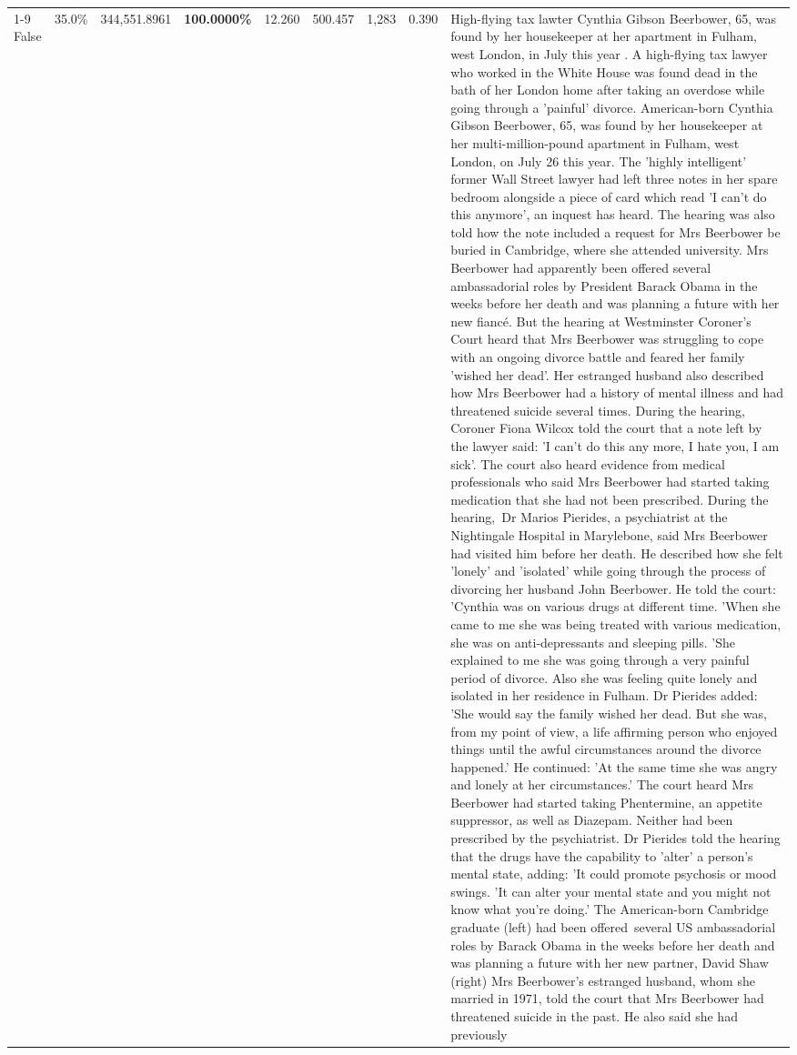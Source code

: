\begin{table}[H]
\begin{tabular}{lllrlllll}
\cline{1-9}
False & 35.0\% & 344,551.8961 & \bfseries \color{red} 100.0000\% & 12.260 & 500.457 & 1,283 & 0.390 & High-flying tax lawter Cynthia Gibson Beerbower, 65, was found by her housekeeper at her apartment in Fulham, west London, in July this year . A high-flying tax lawyer who worked in the White House was found dead in the bath of her London home after taking an overdose while going through a 'painful' divorce. American-born Cynthia Gibson Beerbower, 65, was found by her housekeeper at her multi-million-pound apartment in Fulham, west London, on July 26 this year. The 'highly intelligent' former Wall Street lawyer had left three notes in her spare bedroom alongside a piece of card which read 'I can't do this anymore', an inquest has heard. The hearing was also told how the note included a request for Mrs Beerbower be buried in Cambridge, where she attended university. Mrs Beerbower had apparently been offered several ambassadorial roles by President Barack Obama in the weeks before her death and was planning a future with her new fiancé. But the hearing at Westminster Coroner's Court heard that Mrs Beerbower was struggling to cope with an ongoing divorce battle and feared her family 'wished her dead'. Her estranged husband also described how Mrs Beerbower had a history of mental illness and had threatened suicide several times. During the hearing, Coroner Fiona Wilcox told the court that a note left by the lawyer said: 'I can't do this any more, I hate you, I am sick'. The court also heard evidence from medical professionals who said Mrs Beerbower had started taking medication that she had not been prescribed. During the hearing, Dr Marios Pierides, a psychiatrist at the Nightingale Hospital in Marylebone, said Mrs Beerbower had visited him before her death. He described how she felt 'lonely' and 'isolated' while going through the process of divorcing her husband John Beerbower. He told the court: 'Cynthia was on various drugs at different time. 'When she came to me she was being treated with various medication, she was on anti-depressants and sleeping pills. 'She explained to me she was going through a very painful period of divorce. Also she was feeling quite lonely and isolated in her residence in Fulham. Dr Pierides added: 'She would say the family wished her dead. But she was, from my point of view, a life affirming person who enjoyed things until the awful circumstances around the divorce happened.' He continued: 'At the same time she was angry and lonely at her circumstances.' The court heard Mrs Beerbower had started taking Phentermine, an appetite suppressor, as well as Diazepam. Neither had been prescribed by the psychiatrist. Dr Pierides told the hearing that the drugs have the capability to 'alter' a person's mental state, adding: 'It could promote psychosis or mood swings. 'It can alter your mental state and you might not know what you're doing.' The American-born Cambridge graduate (left) had been offered several US ambassadorial roles by Barack Obama in the weeks before her death and was planning a future with her new partner, David Shaw (right) Mrs Beerbower's estranged husband, whom she married in 1971, told the court that Mrs Beerbower had threatened suicide in the past. He also said she had previously 
\end{tabular}
\end{table}
